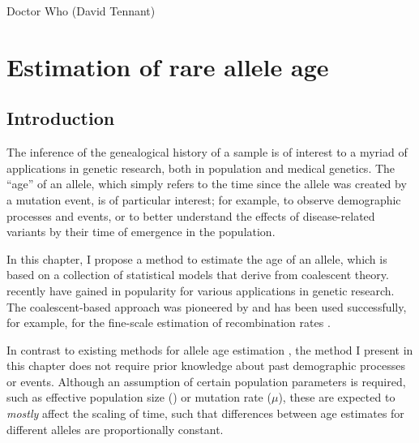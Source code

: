 
\glsresetall


{Doctor Who (David Tennant)}


{
\singlespacing
\chapter{Estimation of rare allele age}
\label{ch:rvage}
\minitoc
}


%
\section{Introduction}
%

The inference of the genealogical history of a sample is of interest to a myriad of applications in genetic research, both in population and medical genetics.
The ``age'' of an allele, which simply refers to the time since the allele was created by a mutation event, is of particular interest; for example, to observe demographic processes and events, or to better understand the effects of disease-related variants by their time of emergence in the population.

In this chapter, I propose a  method to estimate the age of an allele, which is based on a collection of statistical models that derive from coalescent theory.
 recently have gained in popularity for various applications in genetic research.
The coalescent-based approach was pioneered by \citet{Hudson:2001vs} and has been used successfully, for example, for the fine-scale estimation of recombination rates \citep{McVean:2004ca,Myers:2005vi}.

In contrast to existing methods for allele age estimation \citep[\eg, see review by][]{Slatkin:2000us}, the method I present in this chapter does not require prior knowledge about past demographic processes or events.
Although an assumption of certain population parameters is required, such as effective population size (\Ne) or mutation rate ($\mu$), these are expected to \emph{mostly} affect the scaling of time, such that differences between age estimates for different alleles are proportionally constant.

